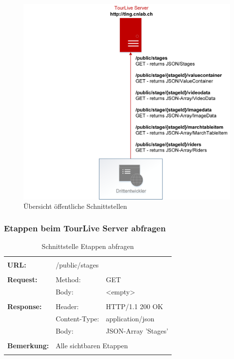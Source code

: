 \begin{figure}[H]
	\centering
	\includegraphics[width=130mm]{images/uebersicht_public_schnittstelle.png}
	\caption{Übersicht öffentliche Schnittstellen}
\end{figure}

\newpage
\subsubsection{Etappen beim TourLive Server abfragen}
\begin{longtable}{ p{2.5cm} || p{3.5cm} p{5.5cm}}
&  \\ [-1.5ex]
	\textbf{URL:} & \multicolumn{2}{l}{/public/stages}  \\ [1ex] \hline & &  \\ [-1.5ex]
	\textbf{Request:} & Method: & GET \\
		& Body: & <empty> \\ [1ex] \hline & &  \\ [-1.5ex]
	\textbf{Response:} &  Header: & HTTP/1.1 200 OK \\
		& Content-Type: & application/json \\
		& Body: & JSON-Array 'Stages' \\ [1ex] \hline & &  \\ [-1.5ex]
	\textbf{Bemerkung:} & \multicolumn{2}{p{9cm}}{Alle sichtbaren Etappen} \\ [1ex] 
\caption{Schnittstelle Etappen abfragen}
\end{longtable}

